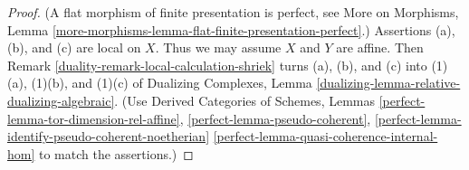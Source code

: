 \begin{proof}

(A flat morphism of finite presentation is perfect, see
More on Morphisms, Lemma
\ref{more-morphisms-lemma-flat-finite-presentation-perfect}.)
Assertions (a), (b), and (c) are local on $X$.
Thus we may assume $X$ and $Y$ are affine.
Then Remark \ref{duality-remark-local-calculation-shriek}
turns (a), (b), and (c) into (1)(a), (1)(b), and (1)(c) of
Dualizing Complexes, Lemma \ref{dualizing-lemma-relative-dualizing-algebraic}.
(Use Derived Categories of Schemes, Lemmas
\ref{perfect-lemma-tor-dimension-rel-affine},
\ref{perfect-lemma-pseudo-coherent},
\ref{perfect-lemma-identify-pseudo-coherent-noetherian}
\ref{perfect-lemma-quasi-coherence-internal-hom} to match the assertions.)


\end{proof}
